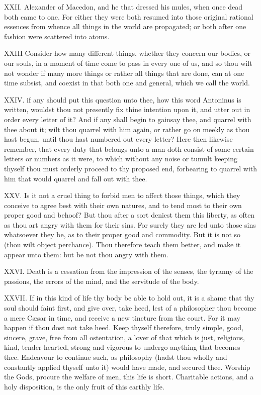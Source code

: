 XXII. Alexander of Macedon, and he that dressed his mules, when once
dead both came to one. For either they were both resumed into those
original rational essences from whence all things in the world are
propagated; or both after one fashion were scattered into atoms.

XXIII Consider how many different things, whether they concern our
bodies, or our souls, in a moment of time come to pass in every one of us,
and so thou wilt not wonder if many more things or rather all things that
are done, can at one time subsist, and coexist in that both one and
general, which we call the world.

XXIV. if any should put this question unto thee, how this word Antoninus
is written, wouldst thou not presently fix thine intention upon it, and
utter out in order every letter of it? And if any shall begin to gainsay
thee, and quarrel with thee about it; wilt thou quarrel with him again, or
rather go on meekly as thou hast begun, until thou hast numbered out every
letter? Here then likewise remember, that every duty that belongs unto a
man doth consist of some certain letters or numbers as it were, to which
without any noise or tumult keeping thyself thou must orderly proceed to
thy proposed end, forbearing to quarrel with him that would quarrel and
fall out with thee.

XXV. Is it not a cruel thing to forbid men to affect those things, which
they conceive to agree best with their own natures, and to tend most to
their own proper good and behoof? But thou after a sort deniest them this
liberty, as often as thou art angry with them for their sins. For surely
they are led unto those sins whatsoever they be, as to their proper good
and commodity. But it is not so (thou wilt object perchance). Thou
therefore teach them better, and make it appear unto them: but be not thou
angry with them.

XXVI. Death is a cessation from the impression of the senses, the
tyranny of the passions, the errors of the mind, and the servitude of the
body.

XXVII. If in this kind of life thy body be able to hold out, it is a
shame that thy soul should faint first, and give over, take heed, lest of
a philosopher thou become a mere Cæsar in time, and receive a new
tincture from the court. For it may happen if thou dost not take heed.
Keep thyself therefore, truly simple, good, sincere, grave, free from all
ostentation, a lover of that which is just, religious, kind,
tender-hearted, strong and vigorous to undergo anything that becomes thee.
Endeavour to continue such, as philosophy (hadst thou wholly and
constantly applied thyself unto it) would have made, and secured thee.
Worship the Gods, procure the welfare of men, this life is short.
Charitable actions, and a holy disposition, is the only fruit of this
earthly life.

